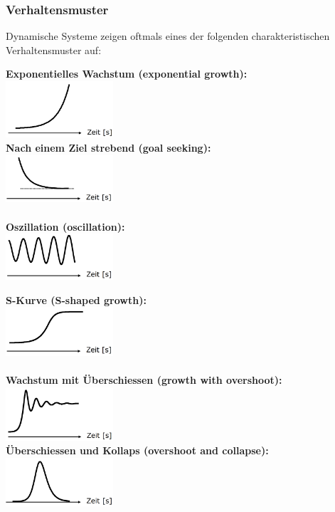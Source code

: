 \subsubsection{Verhaltensmuster}
Dynamische Systeme zeigen oftmals eines der folgenden charakteristischen Verhaltensmuster auf:
\begin{multicols}{3}
	\textbf{Exponentielles Wachstum (exponential growth):} \\
	\includegraphics[width=0.3\textwidth]{pictures/verhalten_1} \\
	\textbf{Nach einem Ziel strebend (goal seeking):} \\
	\includegraphics[width=0.3\textwidth]{pictures/verhalten_2} \\ \\
	\textbf{Oszillation (oscillation):} \\
	\includegraphics[width=0.3\textwidth]{pictures/verhalten_3}
\end{multicols}	
\begin{multicols}{3}
	\textbf{S-Kurve (S-shaped growth):} \\
	\includegraphics[width=0.3\textwidth]{pictures/verhalten_4} \\ \\
	\textbf{Wachstum mit Überschiessen (growth with overshoot):} \\
	\includegraphics[width=0.3\textwidth]{pictures/verhalten_5} \\
	\textbf{Überschiessen und Kollaps (overshoot and collapse):} \\
	\includegraphics[width=0.3\textwidth]{pictures/verhalten_6} 
\end{multicols}	

